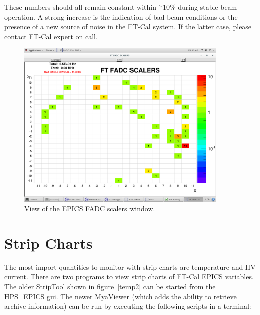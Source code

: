 \documentclass[12pt]{article}
\begin{document}
      These numbers should all remain constant within $^\sim10\%$ during stable beam operation. A strong increase is the indication of bad beam conditions or the presence of a new source of noise in the FT-Cal system.  If the latter case, please contact FT-Cal expert on call.
\begin{figure}[htbp]
\center
\includegraphics[width=0.9\textwidth]{Images/Scalers.png}
\caption{ \label{Scalers} View of the EPICS FADC scalers window.}
\end{figure}

\newpage
  \section{Strip Charts}
      The most import quantities to monitor with strip charts are temperature and HV current.  There are two programs to view strip charts of FT-Cal EPICS variables.  The older StripTool shown in figure~\ref{temp2} can be started from the HPS\_EPICS gui.  The newer MyaViewer (which adds the ability to retrieve archive information) can be run by executing the following scripts in a terminal:
      
\end{document}
